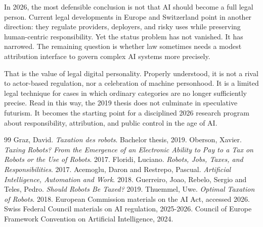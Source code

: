 \documentclass[11pt]{article}
\begin{document}
In 2026, the most defensible conclusion is not that AI should become a full legal person. Current legal developments in Europe and Switzerland point in another direction: they regulate providers, deployers, and risky uses while preserving human-centric responsibility. Yet the status problem has not vanished. It has narrowed. The remaining question is whether law sometimes needs a modest attribution interface to govern complex AI systems more precisely.

That is the value of legal digital personality. Properly understood, it is not a rival to actor-based regulation, nor a celebration of machine personhood. It is a limited legal technique for cases in which ordinary categories are no longer sufficiently precise. Read in this way, the 2019 thesis does not culminate in speculative futurism. It becomes the starting point for a disciplined 2026 research program about responsibility, attribution, and public control in the age of AI.


\begin{thebibliography}{99}
 Graz, David. \textit{Taxation des robots}. Bachelor thesis, 2019.
 Oberson, Xavier. \textit{Taxing Robots? From the Emergence of an Electronic Ability to Pay to a Tax on Robots or the Use of Robots}. 2017.
 Floridi, Luciano. \textit{Robots, Jobs, Taxes, and Responsibilities}. 2017.
 Acemoglu, Daron and Restrepo, Pascual. \textit{Artificial Intelligence, Automation and Work}. 2018.
 Guerreiro, Joao, Rebelo, Sergio and Teles, Pedro. \textit{Should Robots Be Taxed?} 2019.
 Thuemmel, Uwe. \textit{Optimal Taxation of Robots}. 2018.
 European Commission materials on the AI Act, accessed 2026.
 Swiss Federal Council materials on AI regulation, 2025-2026.
 Council of Europe Framework Convention on Artificial Intelligence, 2024.
\end{thebibliography}
\end{document}
